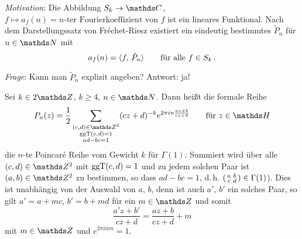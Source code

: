 \emph{Motivation}: Die Abbildung $S_k \ra \CC$, $f \mapsto a_f(n) = \text{$n$-ter Fourierkoeffizient von $f$}$ ist ein lineares Funktional.
Nach dem Darstellungssatz von Fréchet-Riesz existiert ein eindeutig bestimmtes $\tilde P_n$ für $n\in\NN$ mit
\[
	a_f(n) = \scalarprd f{\tilde P_n} \qquad \text{für alle } f\in S_k\,.
\]

\emph{Frage}: Kann man $\tilde P_n$ explizit angeben? Antwort: ja!

\begin{defi}
	Sei $k \in 2\ZZ$, $k \geq 4$, $n\in\NN$. Dann heißt die formale Reihe
	\[
		P_n(z)
		= \frac{1}{2} \sum_{\substack{(c,d)\in\ZZ^2 \\ \ggt(c,d) = 1 \\ ad-bc = 1}} (cz+d)^{-k} e^{2\pi in \frac{az+b}{cz+d}}
		\qquad \text{für } z \in \HH
	\]
	die $n$-te Poincaré Reihe vom Gewicht $k$ für $\Gamma(1)$.
	Summiert wird über alle $(c,d) \in \ZZ^2$ mit $\operatorname{ggT}(c,d) = 1$ und zu jedem solchen Paar ist $(a,b) \in \ZZ^2$ zu bestimmen, so dass $ad-bc = 1$, d.\,h. $\abcd \in \Gamma(1)$).
	Dies ist unabhängig von der Auswahl von $a$, $b$, denn ist auch $a'$, $b'$ ein solches Paar, so gilt $a' = a+mc$, $b' = b + md$ für ein $m \in \ZZ$ und somit
	\[
		\frac{a'z+b'}{cz+d} = \frac{az+b}{cz + d} + m
	\]
	mit $m \in \ZZ$ und $e^{2\pi inm} = 1$.
\end{defi}
